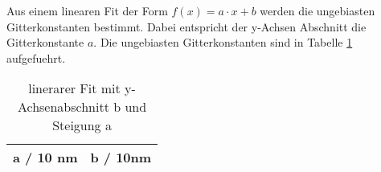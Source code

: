 Aus einem linearen Fit der Form $f(x) = a \cdot x + b$ werden die ungebiasten
Gitterkonstanten bestimmt. 
Dabei entspricht der y-Achsen Abschnitt die Gitterkonstante $a$. 
Die ungebiasten Gitterkonstanten sind in Tabelle \ref{tab:gitt} aufgefuehrt.

\begin{table}[ht]
		\centering
		\caption{linerarer Fit mit y-Achsenabschnitt b und Steigung a}
		\label{tab:gitt}
		\begin{tabular}{c c}
				\toprule
				a / 10 nm & b / 10nm \\
				\midrule
				
				
				\bottomrule
		\end{tabular}
\end{table}
